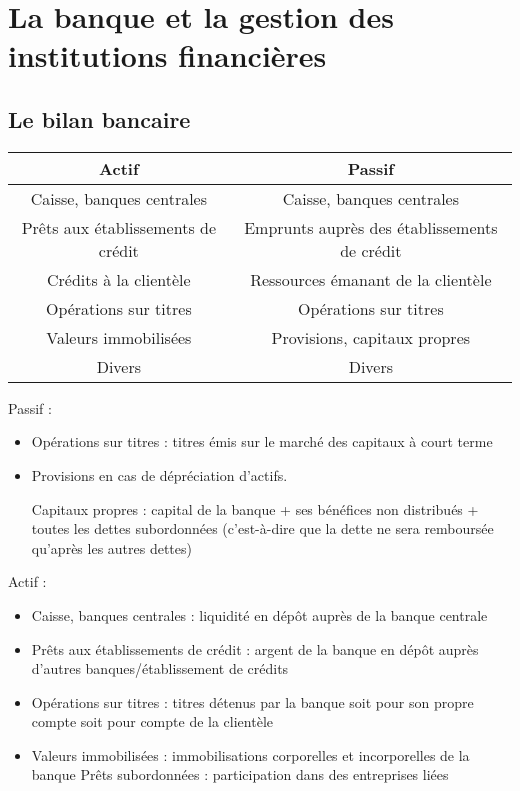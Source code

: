 \chapter{La banque et la gestion des institutions financières}

	\section{Le bilan bancaire}
	
\begin{center}
	\begin{tabular}{|c|c|}
	\hline 
	Actif & Passif \\ 
	\hline 
	Caisse, banques centrales & Caisse, banques centrales \\ 
	\hline 
	Prêts aux établissements de crédit & Emprunts auprès des établissements de crédit \\ 
	\hline 
	Crédits à la clientèle & Ressources émanant de la clientèle \\ 
	\hline 
	Opérations sur titres & Opérations sur titres \\ 
	\hline 
	Valeurs immobilisées & Provisions, capitaux propres \\ 
	\hline 
	Divers & Divers \\ 
	\hline 
	\end{tabular} 
\end{center}
	
	Passif :
	
	\begin{itemize}
		\item Opérations sur titres : titres émis sur le marché des capitaux à court terme
		\item Provisions en cas de dépréciation d'actifs. 
		
			Capitaux propres : capital de la banque + ses bénéfices non distribués + toutes les dettes subordonnées (c'est-à-dire que la dette ne sera remboursée qu'après les autres dettes)
	\end{itemize}
	
	Actif :
	
	\begin{itemize}
		\item Caisse, banques centrales : liquidité en dépôt auprès de la banque centrale
		\item Prêts aux établissements de crédit : argent de la banque en dépôt auprès d'autres banques/établissement de crédits
		\item Opérations sur titres : titres détenus par la banque soit pour son propre compte soit pour compte de la clientèle
		\item Valeurs immobilisées : immobilisations corporelles et incorporelles de la banque
		Prêts subordonnées : participation dans des entreprises liées
	\end{itemize}
	
